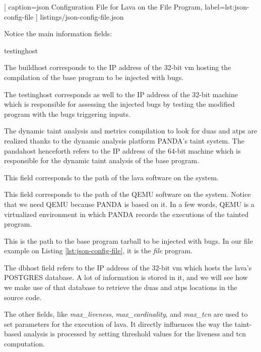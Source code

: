 \vspace{0.5cm}


    [
        caption=\gls{json} Configuration File for Lava on the File Program,
        label=lst:json-config-file
    ]
    {listings/json-config-file.json}
    
Notice the main information fields:

\begin{labeling}{testinghost}
    \item[\emph{buildhost}] The buildhost corresponds to the IP address of the 32-bit \gls{vm} hosting the compilation of the base program to be injected with bugs.
    \item[\emph{testinghost}] The testinghost corresponds as well to the IP address of the 32-bit machine which is responsible for assessing the injected bugs by testing the modified program with the bugs triggering inputs.
    \item[\emph{pandahost}] The dynamic taint analysis and metrics compilation to look for \glspl{dua} and \glspl{atp} are realized thanks to the dynamic analysis platform PANDA's taint system. The pandahost henceforth refers to the IP address of the 64-bit machine which is responsible for the dynamic taint analysis of the base program.
    \item[\emph{lava}] This field corresponds to the path of the \gls{lava} software on the system.
    \item[\emph{qemu}] This field corresponds to the path of the QEMU software on the system. Notice that we need QEMU because PANDA is based on it. In a few words, QEMU is a virtualized environment in which PANDA records the executions of the tainted program.
    \item[\emph{tarfile}] This is the path to the base program tarball to be injected with bugs. In our file example on Listing \ref{lst:json-config-file}, it is the \emph{file} program.
    \item[\emph{dbhost}] The dbhost field refers to the IP address of the 32-bit \gls{vm} which hosts the \gls{lava}'s POSTGRES database. A lot of information is stored in it, and we will see how we make use of that database to retrieve the \glspl{dua} and \glspl{atp} locations in the source code.
\end{labeling}

The other fields, like \emph{max\_liveness}, \emph{max\_cardinality}, and \emph{max\_tcn} are used to set parameters for the execution of \gls{lava}. It directly influences the way the taint-based analysis is processed by setting threshold values for the liveness and \gls{tcn} computation.

